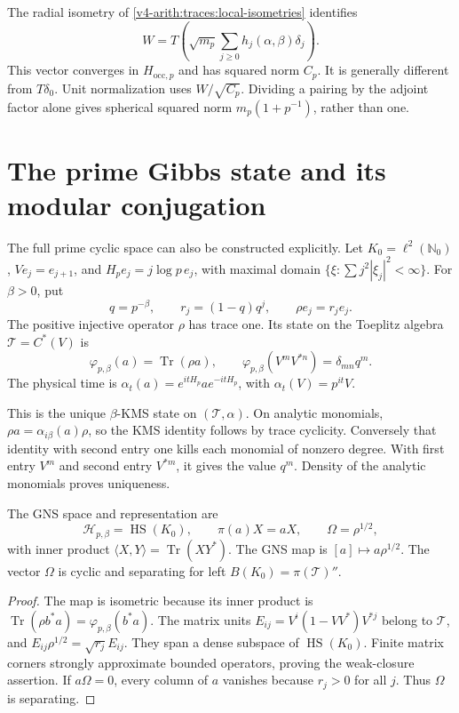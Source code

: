 The radial isometry of \eqref{v4-arith:traces:local-isometries} identifies
\[
 W=T\left(\sqrt{m_p}\sum_{j\geq0}h_j(\alpha,\beta)\delta_j\right).
\]
This vector converges in $H_{\mathrm{occ},p}$ and has squared norm $C_p$. It
is generally different from $T\delta_0$. Unit normalization uses
$W/\sqrt{C_p}$. Dividing a pairing by the adjoint factor alone gives
spherical squared norm $m_p(1+p^{-1})$, rather than one.

\section{The prime Gibbs state and its modular conjugation}

The full prime cyclic space can also be constructed explicitly. Let
$K_0=\ell^2(\mathbb N_0)$, $Ve_j=e_{j+1}$, and $H_pe_j=j\log p\,e_j$, with
maximal domain $\{\xi:\sum j^2|\xi_j|^2<\infty\}$. For $\beta>0$, put
\[
 q=p^{-\beta},\qquad
 r_j=(1-q)q^j,\qquad
 \rho e_j=r_je_j.
\]
The positive injective operator $\rho$ has trace one. Its state on the
Toeplitz algebra $\mathcal T=C^*(V)$ is
\[
 \varphi_{p,\beta}(a)=\operatorname{Tr}(\rho a),\qquad
 \varphi_{p,\beta}(V^mV^{*n})=\delta_{mn}q^m.
\]
The physical time is $\alpha_t(a)=e^{itH_p}ae^{-itH_p}$, with
$\alpha_t(V)=p^{it}V$.

This is the unique $\beta$-KMS state on $(\mathcal T,\alpha)$. On analytic
monomials, $\rho a=\alpha_{i\beta}(a)\rho$, so the KMS identity follows by
trace cyclicity. Conversely that identity with second entry one kills each
monomial of nonzero degree. With first entry $V^m$ and second entry
$V^{*m}$, it gives the value $q^m$. Density of the analytic monomials proves
uniqueness.

\begin{proposition}
\label{v4-arith:traces:prime-gns}
The GNS space and representation are
\[
 \mathcal H_{p,\beta}=\operatorname{HS}(K_0),\qquad
 \pi(a)X=aX,\qquad
 \Omega=\rho^{1/2},
\]
with inner product $\langle X,Y\rangle=\operatorname{Tr}(XY^*)$. The GNS map
is $[a]\mapsto a\rho^{1/2}$. The vector $\Omega$ is cyclic and separating
for left $B(K_0)=\pi(\mathcal T)''$.
\end{proposition}
\begin{proof}
The map is isometric because its inner product is $\operatorname{Tr}(\rho
b^*a)=\varphi_{p,\beta}(b^*a)$. The matrix units $E_{ij}=V^i(1-VV^*)V^{*j}$
belong to $\mathcal T$, and $E_{ij}\rho^{1/2}=\sqrt{r_j}E_{ij}$. They span a
dense subspace of $\operatorname{HS}(K_0)$. Finite matrix corners strongly
approximate bounded operators, proving the weak-closure assertion. If
$a\Omega=0$, every column of $a$ vanishes because $r_j>0$ for all $j$. Thus
$\Omega$ is separating.
\end{proof}

